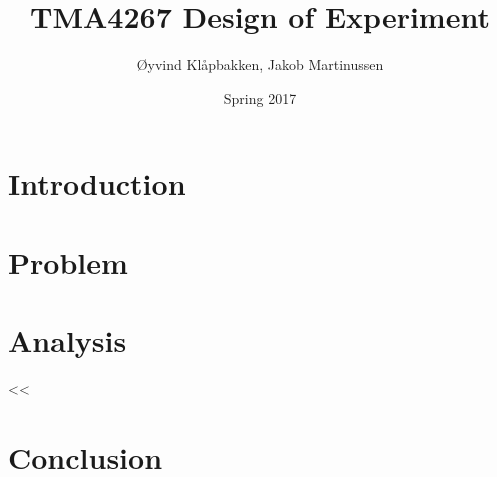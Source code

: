 \documentclass{article}
\title{TMA4267 Design of Experiment}
\author{Øyvind Klåpbakken, Jakob Martinussen}
\date{Spring 2017}
\begin{document}
\maketitle
\tableofcontents
\newpage

\section{Introduction}



\section{Problem}

\section{Analysis}

<<

\section{Conclusion}
\end{document}
